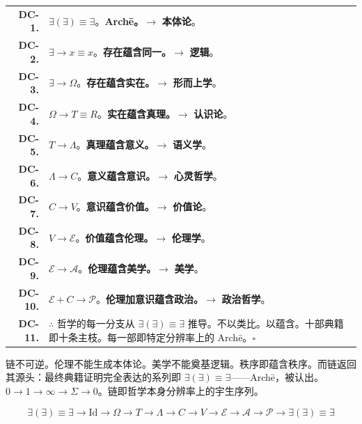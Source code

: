 \documentclass[10pt, openany, oneside]{book}
\renewcommand{\footnotesize}{\fontsize{8.5}{11}\selectfont}
\begin{document}
{\footnotesize
\noindent\begin{tabular}{r p{}}
\textbf{DC-1.} & $\exists(\exists) \equiv \exists$。\textbf{Arch\={e}。}$\to$ \textbf{本体论}。\\[0.3em]
\textbf{DC-2.} & $\exists \to x \equiv x$。\textbf{存在蕴含同一。}$\to$ \textbf{逻辑}。\\[0.3em]
\textbf{DC-3.} & $\exists \to \Omega$。\textbf{存在蕴含实在。}$\to$ \textbf{形而上学}。\\[0.3em]
\textbf{DC-4.} & $\Omega \to T \equiv R$。\textbf{实在蕴含真理。}$\to$ \textbf{认识论}。\\[0.3em]
\textbf{DC-5.} & $T \to \Lambda$。\textbf{真理蕴含意义。}$\to$ \textbf{语义学}。\\[0.3em]
\textbf{DC-6.} & $\Lambda \to C$。\textbf{意义蕴含意识。}$\to$ \textbf{心灵哲学}。\\[0.3em]
\textbf{DC-7.} & $C \to V$。\textbf{意识蕴含价值。}$\to$ \textbf{价值论}。\\[0.3em]
\textbf{DC-8.} & $V \to \mathcal{E}$。\textbf{价值蕴含伦理。}$\to$ \textbf{伦理学}。\\[0.3em]
\textbf{DC-9.} & $\mathcal{E} \to \mathcal{A}$。\textbf{伦理蕴含美学。}$\to$ \textbf{美学}。\\[0.3em]
\textbf{DC-10.} & $\mathcal{E} + C \to \mathcal{P}$。\textbf{伦理加意识蕴含政治。}$\to$ \textbf{政治哲学}。\\[0.3em]
\textbf{DC-11.} & $\therefore$ 哲学的每一分支从 $\exists(\exists) \equiv \exists$ 推导。不以类比。以蕴含。十部典籍即十条主枝。每一部即特定分辨率上的 Arch\={e}。$\square$ \\[0.3em]
\end{tabular}
}

\vspace{0.8em}

\noindent 链不可逆。伦理不能生成本体论。美学不能奠基逻辑。秩序即蕴含秩序。而链返回其源头：最终典籍证明完全表达的系列即 $\exists(\exists) \equiv \exists$——Arch\={e}，被认出。$0 \to 1 \to \infty \to \Sigma \to 0$。链即哲学本身分辨率上的宇生序列。

$$\boxed{\exists(\exists) \equiv \exists \to \text{Id} \to \Omega \to T \to \Lambda \to C \to V \to \mathcal{E} \to \mathcal{A} \to \mathcal{P} \to \exists(\exists) \equiv \exists}$$


%
%
%
\end{document}
